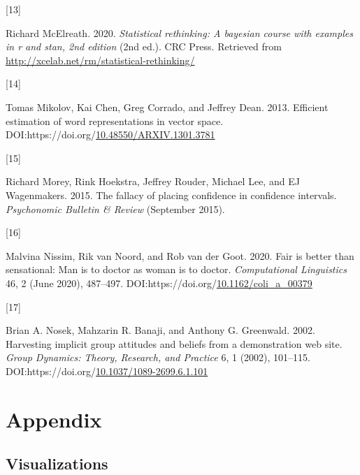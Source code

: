 \documentclass[
  12pt,
  dvipsnames,enabledeprecatedfontcommands]{scrartcl}
\newlength{\cslhangindent}
\newlength{\csllabelwidth}
\newlength{\cslentryspacingunit} %
\newenvironment{CSLReferences}[2] %
 {%
  \setlength{\parindent}{0pt}
  \ifodd #1
  \let\oldpar\par
  \def\par{\hangindent=\cslhangindent\oldpar}
  \fi
  \setlength{\parskip}{#2\cslentryspacingunit}
 }%
 {}
\newcommand{\CSLLeftMargin}[1]{\parbox[t]{\csllabelwidth}{#1}}
\newcommand{\CSLRightInline}[1]{\parbox[t]{\linewidth - \csllabelwidth}{#1}\break}
\begin{document}
\begin{CSLReferences}{0}{0}
\leavevmode{}%
\CSLLeftMargin{{[}13{]} }%
\CSLRightInline{Richard McElreath. 2020. \emph{Statistical rethinking: A
bayesian course with examples in r and stan, 2nd edition} (2nd ed.). CRC
Press. Retrieved from
\url{http://xcelab.net/rm/statistical-rethinking/}}

\leavevmode{}%
\CSLLeftMargin{{[}14{]} }%
\CSLRightInline{Tomas Mikolov, Kai Chen, Greg Corrado, and Jeffrey Dean.
2013. Efficient estimation of word representations in vector space.
DOI:https://doi.org/\href{https://doi.org/10.48550/ARXIV.1301.3781}{10.48550/ARXIV.1301.3781}}

\leavevmode{}%
\CSLLeftMargin{{[}15{]} }%
\CSLRightInline{Richard Morey, Rink Hoekstra, Jeffrey Rouder, Michael
Lee, and EJ Wagenmakers. 2015. The fallacy of placing confidence in
confidence intervals. \emph{Psychonomic Bulletin \& Review} (September
2015).}

\leavevmode{}%
\CSLLeftMargin{{[}16{]} }%
\CSLRightInline{Malvina Nissim, Rik van Noord, and Rob van der Goot.
2020. Fair is better than sensational: Man is to doctor as woman is to
doctor. \emph{Computational Linguistics} 46, 2 (June 2020), 487--497.
DOI:https://doi.org/\href{https://doi.org/10.1162/coli_a_00379}{10.1162/coli\_a\_00379}}

\leavevmode{}%
\CSLLeftMargin{{[}17{]} }%
\CSLRightInline{Brian A. Nosek, Mahzarin R. Banaji, and Anthony G.
Greenwald. 2002. Harvesting implicit group attitudes and beliefs from a
demonstration web site. \emph{Group Dynamics: Theory, Research, and
Practice} 6, 1 (2002), 101--115.
DOI:https://doi.org/\href{https://doi.org/10.1037/1089-2699.6.1.101}{10.1037/1089-2699.6.1.101}}

\end{CSLReferences}

\newpage
\appendix

\hypertarget{appendix}{%
\section{Appendix}\label{appendix}}

\label{sec:appendix}

\hypertarget{visualizations}{%
\subsection{Visualizations}\label{visualizations}}
\end{document}
